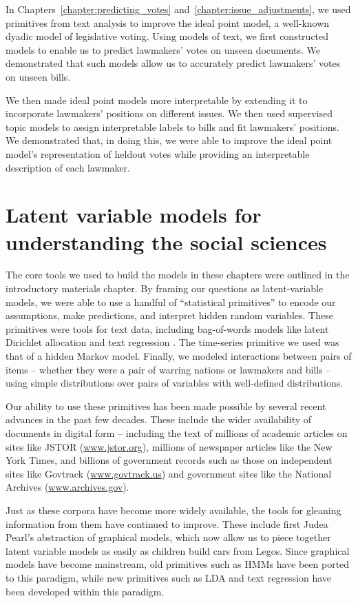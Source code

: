 In Chapters~\ref{chapter:predicting_votes}
and~\ref{chapter:issue_adjustments}, we used primitives from text
analysis to improve the ideal point model, a well-known dyadic model
of legislative voting. Using models of text, we first constructed
models to enable us to predict lawmakers' votes on unseen documents.
We demonstrated that such models allow us to accurately predict
lawmakers' votes on unseen bills.

We then made ideal point models more interpretable by extending it to
incorporate lawmakers' positions on different issues.  We then used
supervised topic models to assign interpretable labels to bills and
fit lawmakers' positions.  We demonstrated that, in doing this, we
were able to improve the ideal point model's representation of heldout
votes while providing an interpretable description of each lawmaker.

\section{Latent variable models for understanding the social sciences}
The core tools we used to build the models in these chapters were
outlined in the introductory materials chapter.  By framing our
questions as latent-variable models, we were able to use a handful of
``statistical primitives'' to encode our assumptions, make
predictions, and interpret hidden random variables.  These primitives
were tools for text data, including bag-of-words models like
latent Dirichlet allocation \citep{blei:2006} and text regression
\citep{kogan:2009}.  The time-series primitive we used was that
of a hidden Markov model.  Finally, we modeled interactions between
pairs of items -- whether they were a pair of warring nations or lawmakers and
bills -- using simple distributions over pairs of variables with
well-defined distributions.

Our ability to use these primitives has been made possible by several
recent advances in the past few decades.  These include the wider
availability of documents in digital form -- including the text of
millions of academic articles on sites like JSTOR (\url{www.jstor.org}), millions of
newspaper articles like the New York Times, and billions of government
records such as those on independent sites like Govtrack
(\url{www.govtrack.us}) and government sites like the National
Archives (\url{www.archives.gov}).

Just as these corpora have become more widely available, the tools for
gleaning information from them have continued to improve.  These
include first Judea Pearl's abstraction of graphical models,
which now allow us to piece together latent variable models as easily
as children build cars from Legos\texttrademark \citep{pearl:1985}.  Since graphical
models have become mainstream, old primitives such as HMMs have been
ported to this paradigm, while new primitives such as LDA and text
regression have been developed within this paradigm.

